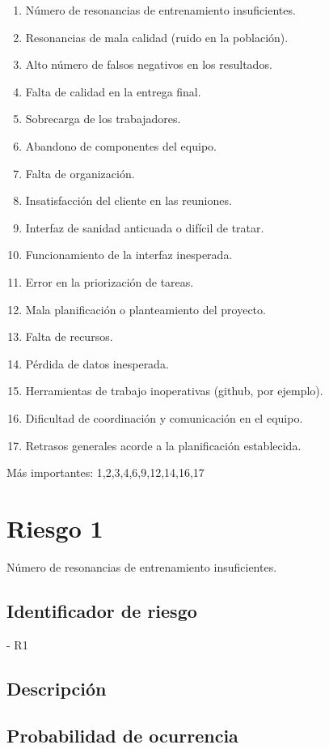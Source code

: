 \begin{enumerate}
	\item Número de resonancias de entrenamiento insuficientes.
	\item Resonancias de mala calidad (ruido en la población).
	\item Alto número de falsos negativos en los resultados.
	\item Falta de calidad en la entrega final.
	\item Sobrecarga de los trabajadores.
	\item Abandono de componentes del equipo.
	\item Falta de organización.
	\item Insatisfacción del cliente en las reuniones.
	\item Interfaz de sanidad anticuada o difícil de tratar.
	\item Funcionamiento de la interfaz inesperada.
	\item Error en la priorización de tareas.
	\item Mala planificación o planteamiento del proyecto.
	\item Falta de recursos.
	\item Pérdida de datos inesperada.
	\item Herramientas de trabajo inoperativas (github, por ejemplo).
	\item Dificultad de coordinación y comunicación en el equipo.
	\item Retrasos generales acorde a la planificación establecida.
\end{enumerate}

Más importantes: 1,2,3,4,6,9,12,14,16,17

\section{Riesgo 1}

Número de resonancias de entrenamiento insuficientes.

\subsection{Identificador de riesgo}
- R1
\subsection{Descripción}
\subsection{Probabilidad de ocurrencia}
